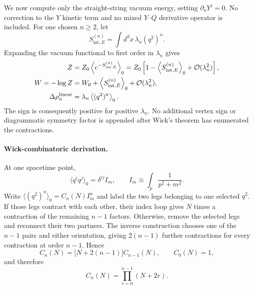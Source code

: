 We now compute only the straight-string vacuum energy, setting
$\partial_aY^i=0$.  No correction to the $Y$ kinetic term and no mixed
$Y$--$Q$ derivative operator is included.  For one chosen $n\geq2$, let
\begin{equation}
  S_{\mathrm{int},E}^{(n)}
  =\int d^d x\,\lambda_n(q^2)^n.
\end{equation}
Expanding the vacuum functional to first order in $\lambda_n$ gives
\begin{align}
  Z
  &=Z_0\left\langle e^{-S_{\mathrm{int},E}^{(n)}}\right\rangle_0
   =Z_0\left[1-\left\langle S_{\mathrm{int},E}^{(n)}\right\rangle_0
     +\mathcal O(\lambda_n^2)\right],
  \notag\\
  W=-\log Z
  &=W_0+\left\langle S_{\mathrm{int},E}^{(n)}\right\rangle_0
    +\mathcal O(\lambda_n^2),
  \notag\\
  \Delta\rho_n^{\mathrm{linear}}
  &=\lambda_n\left\langle(q^2)^n\right\rangle_0.
  \label{eq:potential-vacuum-functional-expansion}
\end{align}
The sign is consequently positive for positive $\lambda_n$.  No additional
vertex sign or diagrammatic symmetry factor is appended after Wick's theorem
has enumerated the contractions.

\paragraph{Wick-combinatoric derivation.}
At one spacetime point,
\begin{equation}
  \langle q^i q^j\rangle_0=\delta^{ij}I_m,
  \qquad
  I_m\equiv\int_p\frac{1}{p^2+m^2}.
\end{equation}
Write
$\langle(q^2)^n\rangle_0=C_n(N)I_m^n$ and label the two legs belonging to
one selected $q^2$.  If those legs contract with each other, their index loop
gives $N$ times a contraction of the remaining $n-1$ factors.  Otherwise,
remove the selected legs and reconnect their two partners.  The inverse
construction chooses one of the $n-1$ pairs and either orientation, giving
$2(n-1)$ further contractions for every contraction at order $n-1$.  Hence
\begin{equation}
  C_n(N)=\bigl[N+2(n-1)\bigr]C_{n-1}(N),
  \qquad C_0(N)=1,
\end{equation}
and therefore
\begin{equation}
  C_n(N)=\prod_{r=0}^{n-1}(N+2r).
  \label{eq:ON-gaussian-moment-product}
\end{equation}

